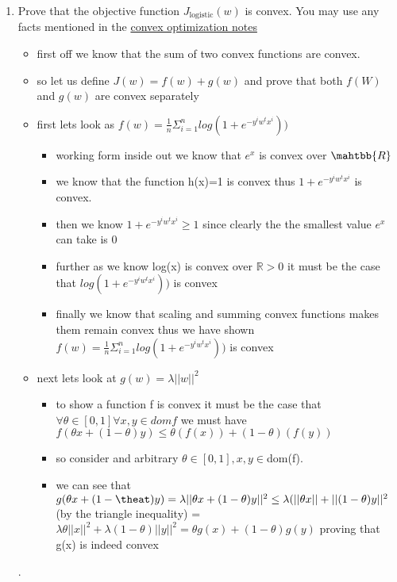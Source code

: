\documentclass{article}
\theoremstyle{plain}
\theoremstyle{definition}
\begin{document}
\begin{enumerate}
  \setcounter{enumi}{\value{saveenum}}
\item Prove that the objective function $J_{\text{logistic}}(w)$ is convex.
You may use any facts mentioned in the \href{https://davidrosenberg.github.io/mlcourse/Notes/convex-optimization.pdf}{convex optimization notes}
\begin{itemize}
    \color{blue}
    \item first off we know that the sum of two convex functions are convex. 
    \item so let us define $J(w)=f(w)+g(w)$ and prove that both $f(W)$ and $g(w)$ are convex separately
    \item first lets look as $f(w)=\frac{1}{n}\Sigma_{i=1}^{n}log(1+e^{-y^iw^tx^i}))$
    \begin{itemize}
        \item working form inside out we know that $e^x$ is convex over $\mahtbb{R}$
        \item we know that the function h(x)=1 is convex thus $1+e^{-y^iw^tx^i}$ is convex. 
        \item then we know $1+e^{-y^iw^tx^i}\geq 1$ since clearly the the smallest value $e^{x}$ can take is 0 
        \item further as we know log(x) is convex over $\mathbb{R}>0$ it must be the case that $log(1+e^{-y^iw^tx^i}))$ is convex
        \item finally we know that scaling and summing convex functions makes them remain convex thus we have shown $f(w)=\frac{1}{n}\Sigma_{i=1}^{n}log(1+e^{-y^iw^tx^i}))$ is convex
    \end{itemize}
    \item next lets look at $g(w)=\lambda||w||^2$
    \begin{itemize}
        \item to show a function f is convex it must be the case that $\forall \theta\in [0,1] \forall x,y\in dom f$ we must have $f(\theta x +(1-\theta)y)\leq \theta(f(x))+(1-\theta)(f(y))$
        \item so consider and arbitrary $\theta \in [0,1] ,x,y\in $dom(f). 
        \item we can see that $g(\theta x + (1-\theat) y)=\lambda||\theta x+ (1-\theta)y||^2\leq \lambda (||\theta x||+ ||(1-\theta)y||^2 $ (by the triangle inequality) = $\lambda \theta ||x||^2+ \lambda (1-\theta)||y||^2=\theta g(x)+(1-\theta)g(y)$ proving that g(x) is indeed convex
    \end{itemize}
\end{itemize}
.


\end{enumerate}
\end{document}
